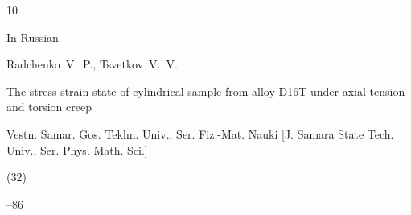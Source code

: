 \begin{thebibliography}{10}





%
















\lang In Russian

\by Radchenko~V.~P., Tsvetkov~V.~V.

\paper The stress-strain state of cylindrical sample from alloy D16T under axial tension and torsion creep

\jour Vestn. Samar. Gos. Tekhn. Univ., Ser. Fiz.-Mat. Nauki \rm [J. Samara State Tech. Univ., Ser. Phys. Math. Sci.]


(32)

--86




\end{thebibliography}





%

